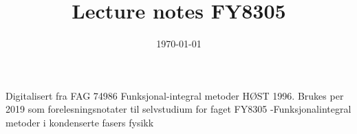\documentclass{article}
\title{Lecture notes FY8305}
\date{\today}
\theoremstyle{definition}
\begin{document}
\maketitle
Digitalisert fra FAG 74986 Funksjonal-integral metoder HØST 1996.
Brukes per 2019 som forelesningsnotater til selvstudium for faget FY8305 -Funksjonalintegral metoder i kondenserte fasers fysikk

\tableofcontents







\end{document}
